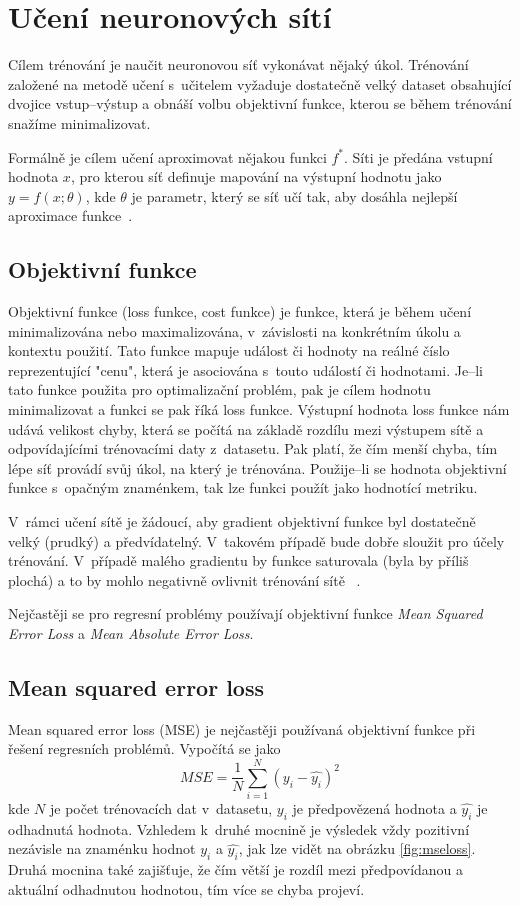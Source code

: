 \section{Učení neuronových sítí}
Cílem trénování je naučit neuronovou síť vykonávat nějaký úkol. Trénování založené na metodě učení s~učitelem vyžaduje dostatečně velký dataset obsahující dvojice vstup--výstup a obnáší volbu objektivní funkce, kterou se během trénování snažíme minimalizovat. 

Formálně je cílem učení aproximovat nějakou funkci $f^\ast$. Síti je předána vstupní hodnota $x$, pro kterou síť definuje mapování na výstupní hodnotu jako $y = f(x; \theta)$, kde $\theta$ je parametr, který se síť učí tak, aby dosáhla nejlepší aproximace funkce~\cite{mitdeeplearning}.


\subsection{Objektivní funkce}
Objektivní funkce (loss funkce, cost funkce) je funkce, která je během učení minimalizována nebo maximalizována, v~závislosti na konkrétním úkolu a kontextu použití. Tato funkce mapuje událost či hodnoty na reálné číslo reprezentující  "cenu", která je asociována s~touto událostí či hodnotami. Je--li tato funkce použita pro optimalizační problém, pak je cílem hodnotu minimalizovat a funkci se pak říká loss funkce. Výstupní hodnota loss funkce nám udává velikost chyby, která se počítá na základě rozdílu mezi výstupem sítě a odpovídajícími trénovacími daty z~datasetu. Pak platí, že čím menší chyba, tím lépe síť provádí svůj úkol, na který je trénována. Použije--li se hodnota objektivní funkce s~opačným znaménkem, tak lze funkci použít jako hodnotící metriku.


V~rámci učení sítě je žádoucí, aby gradient objektivní funkce byl dostatečně velký (prudký) a předvídatelný. V~takovém případě bude dobře sloužit pro účely trénování. V~případě malého gradientu by funkce saturovala (byla by příliš plochá) a to by mohlo negativně ovlivnit trénování sítě~ \cite{mitdeeplearning}. 

Nejčastěji se pro regresní problémy používají objektivní funkce \textit{Mean Squared Error Loss} a \textit{Mean Absolute Error Loss}.


\subsection*{Mean squared error loss}
Mean squared error loss (MSE) je nejčastěji používaná objektivní funkce při řešení regresních problémů. Vypočítá se jako
\begin{equation}
  MSE = \frac{1}{N}\sum_{i=1}^N(y_i - \hat{y_i})^2
\end{equation}
kde $N$ je počet trénovacích dat v~datasetu, $y_i$ je předpovězená hodnota a $\hat{y_i}$ je odhadnutá hodnota. Vzhledem k~druhé mocnině je výsledek vždy pozitivní nezávisle na znaménku hodnot $y_i$ a $\hat{y_i}$, jak lze vidět na obrázku \ref{fig:mseloss}. Druhá mocnina také zajišťuje, že čím větší je rozdíl mezi předpovídanou a aktuální odhadnutou hodnotou, tím více se chyba projeví. 

